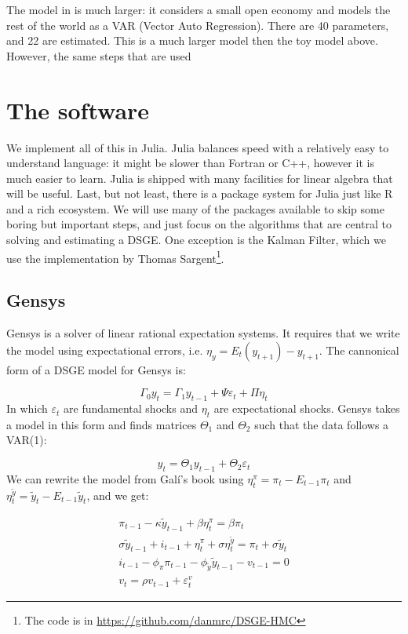 \documentclass[12pt,a4paper]{article}
\begin{document}
The model in \cite{carvalho2015} is much larger: it considers a small open economy and models the rest of the world as a VAR (Vector Auto Regression). There are 40 parameters, and 22 are estimated. This is a much larger model then the toy model above. However, the same steps that are used 

\section{The software}

We implement all of this in Julia. Julia balances speed with a relatively easy to understand language: it might be slower than Fortran or C++, however it is much easier to learn. Julia is shipped with many facilities for linear algebra that will be useful. Last, but not least, there is a package system for Julia just like R and a rich ecosystem. We will use many of the packages available to skip some boring but important steps, and just focus on the algorithms that are central to solving and estimating a DSGE. One exception is the Kalman Filter, which we use the implementation by Thomas Sargent\footnote{The code is in \url{https://github.com/danmrc/DSGE-HMC}}.

\subsection{Gensys}

Gensys is a solver of linear rational expectation systems. It requires that we write the model using expectational errors, i.e. $\eta_y = E_{t}(y_{t+1}) - y_{t+1}$. The cannonical form of a DSGE model for Gensys is:

\[
\Gamma_0 y_t = \Gamma_1 y_{t-1} + \Psi \varepsilon_t + \Pi \eta_t
\]
In which $\varepsilon_t$ are fundamental shocks and $\eta_t$ are expectational shocks. Gensys takes a model in this form and finds matrices $\Theta_1$ and $\Theta_2$ such that the data follows a VAR(1):

\[
y_t = \Theta_1 y_{t-1} + \Theta_2 \varepsilon_t
\]
We can rewrite the model from Galí's book using $\eta_t^{\pi} = \pi_t - E_{t-1} \pi_t$ and $\eta_t^{\tilde{y}} = \tilde{y}_t - E_{t-1} \tilde{y}_t$, and we get:

\begin{align} 
\pi_{t-1} - \kappa \tilde{y}_{t-1} + \beta \eta_t^{\pi} = \beta \pi_t\\
\sigma\tilde{y}_{t-1} + i_{t-1} + \eta_t^{\pi} + \sigma \eta_t^{\tilde{y}} = \pi_t + \sigma \tilde{y}_t\\
i_{t-1} - \phi_{\pi}\pi_{t-1} - \phi_{\tilde{y}} \tilde{y}_{t-1} - v_{t-1} = 0\\
v_t = \rho v_{t-1} + \varepsilon^v_t
\end{align}
\end{document}
